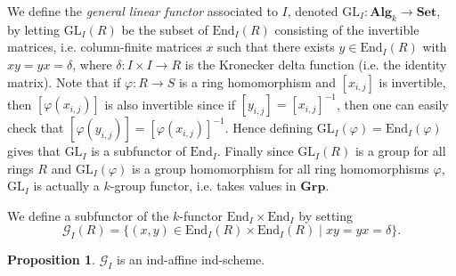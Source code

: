\documentclass[oneside,11pt]{amsart}
\newcommand{\bSet}{\ensuremath{\textbf{Set}}}
\newcommand{\bAlg}{\ensuremath{\textbf{Alg}}}
\newcommand{\bGrp}{\ensuremath{\textbf{Grp}}}
\newcommand{\mG}{\ensuremath{\mathcal{G}}}
\newcommand{\GL}{\ensuremath{\text{GL}}}
\newcommand{\End}{\ensuremath{\text{End}}}
\theoremstyle{definition}
\newtheorem{proof techniques}{Proof Techniques}
\newtheorem{proposition}{Proposition}
\begin{document}
We define the \emph{general linear functor} associated to $I$, denoted $\GL_I : \bAlg_k \to \bSet$, by letting $\GL_I(R)$ be the subset of $\End_I(R)$ consisting of the invertible matrices, i.e. column-finite matrices $x$ such that there exists $y \in \End_I(R)$ with $xy = yx = \delta$, where $\delta : I \times I \to R$ is the Kronecker delta function (i.e. the identity matrix). Note that if $\varphi: R \to S$ is a ring homomorphism and $[x_{i,j}]$ is invertible, then $[\varphi(x_{i,j})]$ is also invertible since if $[y_{i,j}] = [x_{i,j}]^{-1}$, then one can easily check that $[\varphi(y_{i,j})] = [\varphi(x_{i,j})]^{-1}$. Hence defining $\GL_I(\varphi) = \End_I(\varphi)$ gives that $\GL_I$ is a subfunctor of $\End_I$. Finally since $\GL_I(R)$ is a group for all rings $R$ and $\GL_I(\varphi)$ is a group homomorphism for all ring homomorphisms $\varphi$, $\GL_I$ is actually a $k$-group functor, i.e. takes values in $\bGrp$. 




We define a subfunctor of the $k$-functor $\End_I \times \End_I$ by setting
\begin{equation*}
\mG_I(R) = \{ (x , y)  \in \End_I(R) \times \End_I(R)  \mid xy = yx = \delta \}. 
\end{equation*}



\begin{proposition}\label{prop: closed subfunctor version of GL is an ind-affine ind-scheme}
$\mG_I$ is an ind-affine ind-scheme.
\end{proposition}
\end{document}
